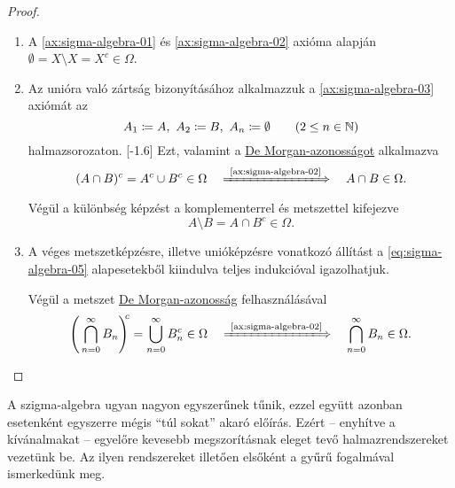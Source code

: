 \documentclass[
]{elteikthesis}[2024/04/26]
\begin{document}
	\begin{proof}\,
		\begin{enumerate}[label={(\( \Sigma \)\arabic*)}, ref={\( \Sigma \)\arabic*.}, start=4]
			\item 
			A \ref{ax:sigma-algebra-01} és \ref{ax:sigma-algebra-02} axióma alapján
			\( \emptyset = X \setminus X = X^c \in \Omega \).
			
			\item Az unióra való zártság bizonyításához alkalmazzuk a
			\ref{ax:sigma-algebra-03} axiómát az
			\[
				A_1 \coloneq A, \ A_2 \coloneq B, \ A_n \coloneq \emptyset
				\qquad (2 \leq n \in \mathbb{N})
			\]
			halmazsorozaton.
			[-1.6\baselineskip]
			Ezt, valamint a \hyperref[th:metszet-de-morgan]{De Morgan-azonosságot} alkalmazva
			\[
				(A \cap B)^c = A^c \cup B^c \in \Omega
				\quad \xLongrightarrow{\ \text{\ref{ax:sigma-algebra-02}} } \quad
				A \cap B \in \Omega.
			\]
			Végül a különbség képzést a komplementerrel és metszettel kifejezve
			\[
				A \setminus B = A \cap B^c \in \Omega.
			\]
			
			\item 
			A véges metszetképzésre, illetve unióképzésre vonatkozó állítást a \ref{eq:sigma-algebra-05}
			alapesetekből kiindulva teljes indukcióval igazolhatjuk.
			
			Végül a metszet \hyperref[th:metszet-de-morgan]{De Morgan-azonosság} felhasználásával
			\[
				\Biggl( \, \bigcap_{n=0}^{\infty} B_n \Biggr)^{\! \! c} =
				\bigcup_{n=0}^{\infty} B_n^c \in \Omega
				\quad \xLongrightarrow{\ \text{\ref{ax:sigma-algebra-02}} } \quad
				\bigcap_{n=0}^{\infty} B_n \in \Omega.
			\]
		\end{enumerate}
	\end{proof}
	
	\noindent
	A szigma-algebra ugyan nagyon egyszerűnek tűnik, 
	ezzel együtt azonban esetenként egyszerre mégis ``túl sokat'' akaró előírás.
	Ezért -- enyhítve a	kívánalmakat -- 
	egyelőre kevesebb megszorításnak eleget tevő halmazrendszereket vezetünk be. 
	Az ilyen rendszereket illetően elsőként a gyűrű fogalmával ismerkedünk meg.	
	
\end{document}
